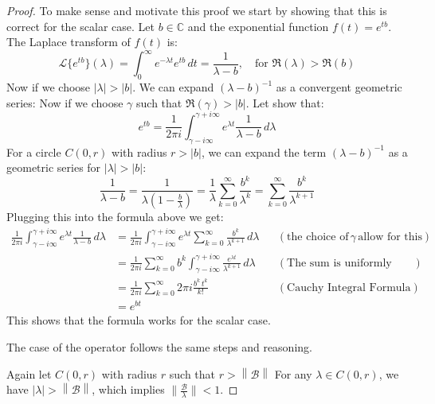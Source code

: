 \documentclass[12pt, oneside]{book}
\newcommand{\norm}[1]{\left\lVert#1\right\rVert}
\newcommand{\B}{\mathscr{B}}
\begin{document}
\begin{proof}
	To make sense and motivate this proof we start by showing that this is correct for the scalar case. Let $b \in \mathbb{C}$ and the exponential function $f(t) = e^{tb}$. The Laplace transform of $f(t)$ is:
	$$
\mathscr{L}\{e^{tb}\}(\lambda) = \int_0^\infty e^{-\lambda t} e^{tb} \, dt = \frac{1}{\lambda - b}, \quad \text{for } \Re(\lambda) > \Re(b)
	$$
	Now if we choose $\left|\lambda\right| > \left|b\right|$. We can expand $(\lambda - b)^{-1}$ as a convergent geometric series:
	Now if we choose $\gamma$ such that $\Re(\gamma) > \left| b \right|$. Let show that:
	$$
		e^{tb} = \frac{1}{2\pi i} \int_{\gamma - i\infty}^{\gamma + i\infty} e^{\lambda t} \frac{1}{\lambda - b} \, d\lambda
	$$
	For a circle $C(0, r)$ with radius $r > |b|$, we can expand the term $(\lambda - b)^{-1}$ as a geometric series for $|\lambda| > |b|$:
	$$
	\frac{1}{\lambda - b} = \frac{1}{\lambda(1 - \frac{b}{\lambda})} = \frac{1}{\lambda} \sum_{k = 0}^{\infty}{\frac{b^k}{\lambda^k}} = \sum_{k = 0}^{\infty}{\frac{b^k}{\lambda^{k+1}}}
	$$
	Plugging this into the formula above we get:
	\begin{align*}
		\frac{1}{2\pi i} \int_{\gamma - i\infty}^{\gamma + i\infty} e^{\lambda t} \frac{1}{\lambda - b} \, d\lambda
		&= \frac{1}{2\pi i} \int_{\gamma - i\infty}^{\gamma + i\infty} e^{\lambda t} \sum_{k = 0}^{\infty}{\frac{b^k}{\lambda^{k+1}}} \, d\lambda && (\text{the choice of} \, \gamma \, \text{allow for this}) \\
		&= \frac{1}{2\pi i} \sum_{k = 0}^{\infty} b^k \int_{\gamma - i\infty}^{\gamma + i\infty} \frac{e^{\lambda t}}{\lambda^{k+1}} \, d\lambda && \left(\text{The sum is uniformly convergent}\right) \\
		&= \frac{1}{2\pi i} \sum_{k = 0}^{\infty} 2\pi i \frac{b^k \, t^k}{k!} && \left(\text{Cauchy Integral Formula}\right) \\
		&= e^{bt}
	\end{align*}
	This shows that the formula works for the scalar case.

	\bigskip

	The case of the operator follows the same steps and reasoning.

	Again let $C(0,r)$ with radius $r$ such that $r > \norm{\B}$ For any $\lambda \in C(0,r)$, we have $|\lambda| > \norm{\B}$, which implies $\|\frac{\B}{\lambda}\| < 1$.


\end{proof}
\end{document}
